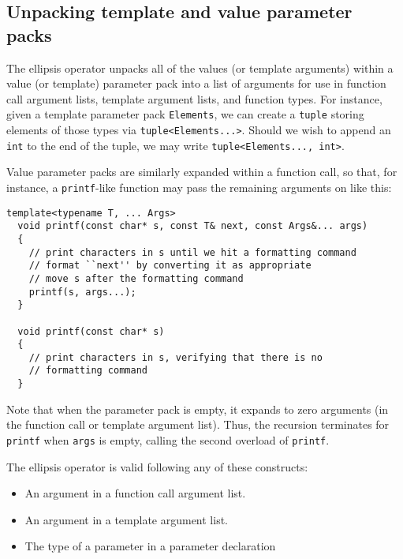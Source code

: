 \documentclass{article}
\begin{document}
\subsection{Unpacking template and value parameter packs}
The ellipsis operator unpacks all of the values (or template
arguments) within a value (or template) parameter pack into a list of
arguments for use in function call argument lists, template argument
lists, and function types. For instance, given a template parameter pack
{\tt Elements}, we can create a {\tt tuple} storing elements of those
types via {\tt tuple<Elements...>}. Should we wish to append an {\tt int}
to the end of the tuple, we may write {\tt tuple<Elements..., int>}.

Value parameter packs are similarly expanded within a function call,
so that, for instance, a {\tt printf}-like function may pass the
remaining arguments on like this:
\begin{verbatim}
template<typename T, ... Args>
  void printf(const char* s, const T& next, const Args&... args)
  {
    // print characters in s until we hit a formatting command
    // format ``next'' by converting it as appropriate
    // move s after the formatting command
    printf(s, args...); 
  }

  void printf(const char* s)
  {
    // print characters in s, verifying that there is no 
    // formatting command
  }
\end{verbatim}

Note that when the parameter pack is empty, it expands to zero
arguments (in the function call or template argument list). Thus, the
recursion terminates for \texttt{printf} when {\tt args} is empty,
calling the second overload of \texttt{printf}.

The ellipsis operator is valid following any of these constructs:
\begin{itemize}
\item An argument in a function call argument list.
\item An argument in a template argument list.
\item The type of a parameter in a parameter declaration
\end{itemize}
\end{document}
